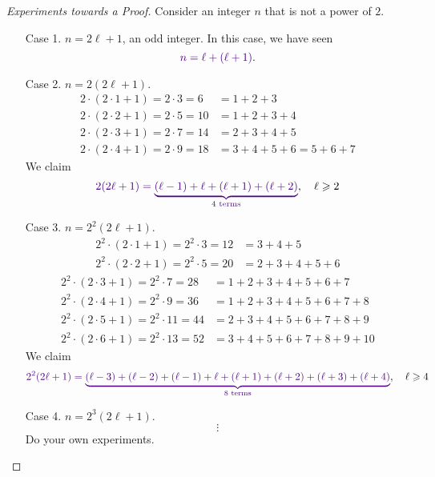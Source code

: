 \begin{example}
\vspace*{0.5em}

\begin{proof}[Experiments towards a Proof]\renewcommand{\qed}{}
Consider an integer $n$ that is not a power of $2$.
\begin{itemize}[leftmargin=4em]
\item[Case 1.] $n = 2\ell + 1$, an odd integer. In this case, we have seen \[{\color{indigo}n = \ell + (\ell + 1)}.\]

\item[Case 2.] $n = 2(2\ell + 1)$.
\begin{align*}
2\cdot (2\cdot 1 + 1) = 2\cdot 3 = 6 &= 1 + 2 + 3\\[0.5em]
2\cdot (2\cdot 2 + 1) = 2\cdot 5 = 10 &= 1 + 2 + 3 + 4\\[0.5em]
2\cdot (2\cdot 3 + 1) = 2\cdot 7 = 14 &= 2 + 3 + 4 + 5\\[0.5em]
2\cdot (2\cdot 4 + 1) = 2\cdot 9 = 18 &= 3 + 4 + 5 + 6 = 5 + 6 + 7
\end{align*}
We claim
\[{\color{indigo}2(2\ell + 1) = \underbrace{(\ell - 1) + \ell + (\ell + 1) + (\ell + 2)}_{\text{$4$ terms}}},\quad \ell \geq 2\]

\item[Case 3.] $n = 2^2(2\ell + 1)$. 
\begin{align*}
2^2\cdot (2\cdot 1 + 1) = 2^2\cdot 3 = 12 &= 3 + 4 + 5\\[0.5em]
2^2\cdot (2\cdot 2 + 1) = 2^2\cdot 5 = 20 &= 2 + 3 + 4 + 5 + 6
\end{align*}\newpage
\begin{align*}
2^2\cdot (2\cdot 3 + 1) = 2^2\cdot 7 = 28 &= 1 + 2 + 3 + 4 + 5 + 6 + 7\\[0.5em]
2^2\cdot (2\cdot 4 + 1) = 2^2\cdot 9 = 36 &= 1 + 2 + 3 + 4 + 5 + 6 + 7 + 8\\[0.5em]
2^2\cdot (2\cdot 5 + 1) = 2^2\cdot 11 = 44 &= 2 + 3 + 4 + 5 + 6 + 7 + 8 + 9\\[0.5em]
2^2\cdot (2\cdot 6 + 1) = 2^2\cdot 13 = 52 &= 3 + 4 + 5 + 6 + 7 + 8 + 9 + 10
\end{align*}
We claim
\[{\color{indigo}2^2(2\ell + 1) = \underbrace{(\ell - 3) + (\ell - 2) + (\ell - 1) + \ell + (\ell + 1) + (\ell + 2) + (\ell + 3) + (\ell + 4)}_{\text{$8$ terms}}},\quad \ell \geq 4\]

\item[Case 4.] $n = 2^3(2\ell + 1)$. 
\[\vdots\]
Do your own experiments.
\end{itemize}
\end{proof}


\end{example}
